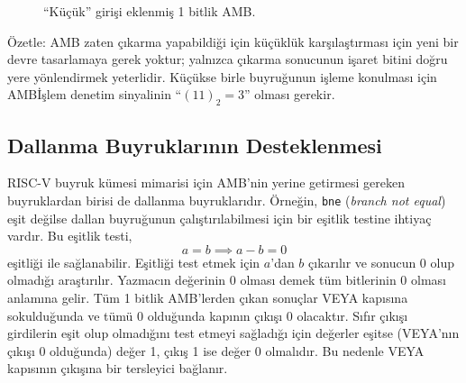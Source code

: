 \begin{figure}[htbp]
\caption[``K{\"u}{\c{c}}{\"u}k'' giri{\c{s}}i eklenmi{\c{s}} 1 bitlik AMB]{``K{\"u}{\c{c}}{\"u}k'' giri{\c{s}}i eklenmi{\c{s}} 1 bitlik AMB.}
\label{fig:1bit-amb-kucuk}
\end{figure}

Özetle: AMB zaten çıkarma yapabildiği için küçüklük karşılaştırması için yeni bir devre tasarlamaya gerek yoktur; yalnızca çıkarma sonucunun işaret bitini doğru yere yönlendirmek yeterlidir. Küçükse birle buyruğunun işleme konulması için AMBİşlem denetim sinyalinin ``$(11)_2 = 3$'' olması gerekir.

\subsection{Dallanma Buyruklarının Desteklenmesi}

RISC-V buyruk kümesi mimarisi için AMB'nin yerine getirmesi gereken buyruklardan birisi de dallanma buyruklarıdır. Örneğin, \texttt{bne} (\emph{branch not equal}) eşit değilse dallan buyruğunun çalıştırılabilmesi için bir eşitlik testine ihtiyaç vardır. Bu eşitlik testi,
\[
a = b \implies a - b = 0
\]
eşitliği ile sağlanabilir. Eşitliği test etmek için $a$'dan $b$ çıkarılır ve sonucun 0 olup olmadığı araştırılır. Yazmacın değerinin 0 olması demek tüm bitlerinin 0 olması anlamına gelir. Tüm 1 bitlik AMB'lerden çıkan sonuçlar VEYA kapısına sokulduğunda ve tümü 0 olduğunda kapının çıkışı 0 olacaktır. Sıfır çıkışı girdilerin eşit olup olmadığını test etmeyi sağladığı için değerler eşitse (VEYA'nın çıkışı 0 olduğunda) değer 1, çıkış 1 ise değer 0 olmalıdır. Bu nedenle VEYA kapısının çıkışına bir tersleyici bağlanır.

